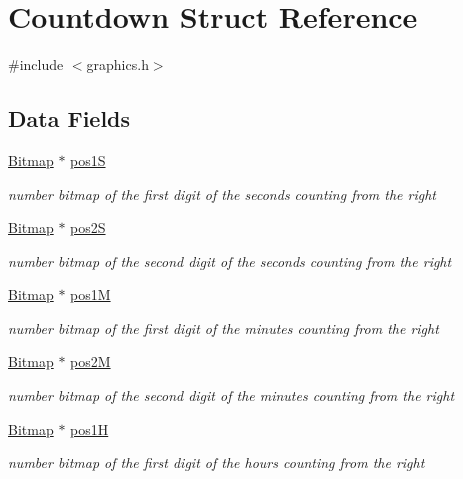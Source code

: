 \hypertarget{struct_countdown}{}\section{Countdown Struct Reference}
\label{struct_countdown}


{\ttfamily \#include $<$graphics.\+h$>$}

\subsection*{Data Fields}
\begin{DoxyCompactItemize}
\item 
\hyperlink{struct_bitmap}{Bitmap} $\ast$ \hyperlink{struct_countdown_a12a5b7122e87d4bf2674d44ccf76668b}{pos1S}
\begin{DoxyCompactList}\small\item\em number bitmap of the first digit of the seconds counting from the right \end{DoxyCompactList}\item 
\hyperlink{struct_bitmap}{Bitmap} $\ast$ \hyperlink{struct_countdown_a80db50da83aa5fe4121181b08f4e284a}{pos2S}
\begin{DoxyCompactList}\small\item\em number bitmap of the second digit of the seconds counting from the right \end{DoxyCompactList}\item 
\hyperlink{struct_bitmap}{Bitmap} $\ast$ \hyperlink{struct_countdown_a8ade0ba6666bd6084af2448eb493f773}{pos1M}
\begin{DoxyCompactList}\small\item\em number bitmap of the first digit of the minutes counting from the right \end{DoxyCompactList}\item 
\hyperlink{struct_bitmap}{Bitmap} $\ast$ \hyperlink{struct_countdown_ab681829c70b665852790841ebfb07d2d}{pos2M}
\begin{DoxyCompactList}\small\item\em number bitmap of the second digit of the minutes counting from the right \end{DoxyCompactList}\item 
\hyperlink{struct_bitmap}{Bitmap} $\ast$ \hyperlink{struct_countdown_a34e0e880818ee4a4a94a6be9948adb55}{pos1H}
\begin{DoxyCompactList}\small\item\em number bitmap of the first digit of the hours counting from the right \end{DoxyCompactList}\item 

\end{DoxyCompactItemize}
